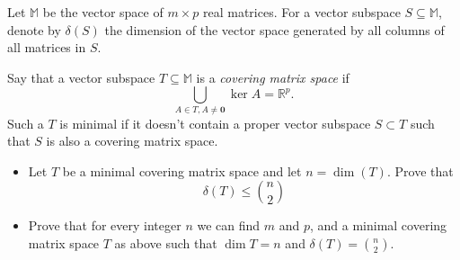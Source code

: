Let \(\mathbb{M}\) be the vector space of \(m \times p\) real matrices.
For a vector subspace \(S\subseteq \mathbb{M}\), denote by \(\delta(S)\) the dimension of the vector space generated by all columns of all matrices in \(S\).

Say that a vector subspace \(T\subseteq \mathbb{M}\) is a \emph{covering matrix space} if
\[ \bigcup_{A\in T, A\ne \mathbf{0}} \ker A =\mathbb{R}^p. \]
Such a \(T\) is minimal if it doesn't contain a proper vector subspace \(S\subset T\) such that \(S\) is also a covering matrix space.
\begin{itemize}
  \item[(a)] Let \(T\) be a minimal covering matrix space and let \(n=\dim (T)\). Prove that \[ \delta(T)\le \binom{n}{2} \]
  \item[(b)] Prove that for every integer \(n\) we can find \(m\) and \(p\), and a minimal covering matrix space \(T\) as above such that \(\dim T=n\) and \(\delta(T)=\binom{n}{2}\).
\end{itemize}
